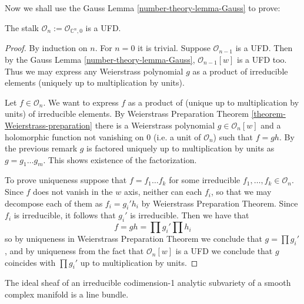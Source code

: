Now we shall use the Gauss Lemma 
\ref{number-theory-lemma-Gauss} to prove:

\begin{lemma}
\label{lemma-stalk-is-UFD}
The stalk $\mathcal{O}_n:=\mathcal{O}_{\mathbb{C}^n,0}$ is a UFD.
\end{lemma}

\begin{proof}
By induction on $n$. For $n=0$ it is trivial. Suppose $\mathcal{O}_{n-1}$ is a
UFD. Then by the Gauss Lemma 
\ref{number-theory-lemma-Gauss}, $\mathcal{O}_{n-1}[w]$ is a UFD
too. Thus we may express any Weierstrass polynomial $g$ as a product of
irreducible elements (uniquely up to multiplication by units).

Let $f\in \mathcal{O}_n$. We want to express $f$ as a product of (unique up to
multiplication by units) of irreducible elements. By Weierstrass Preparation
Theorem \ref{theorem-Weierstrass-preparation} there is a Weierstrass polynomial
$g\in\mathcal{O}_n[w]$ and a holomorphic function not vanishing on $0$ (i.e. a
unit of $\mathcal{O}_n$) such that $f=gh$. By the previous remark $g$ is
factored uniquely up to multiplication by units as $g=g_1\ldots g_m$. This shows
existence of the factorization.

To prove uniqueness suppose that $f=f_1\ldots f_k$ for some irreducible
$f_1,\ldots,f_k\in\mathcal{O}_n$. Since $f$ does not vanish in the $w$ axis,
neither can each $f_i$, so that we may decompose each of them as  $f_i=g_i'h_i$
by Weierstrass Preparation Theorem. Since $f_i$ is irreducible, it follows that
$g_i'$ is irreducible. Then we have that $$ f=gh=\prod g_i'\prod h_i $$ so by
uniqueness in Weierstrass Preparation Theorem we conclude that $g=\prod g_i'$,
and by uniqueness from the fact that  $\mathcal{O}_n[w]$ is a UFD we conclude
that $g$ coincides with $\prod g_i'$ up to multiplication by units.
\end{proof}

\begin{lemma}
\label{lemma-ideal-sheaf-is-line-bundle-analytic-varieties}
The ideal sheaf of an irreducible codimension-1 analytic subvariety of a smooth
complex manifold is a line bundle.
\end{lemma}

